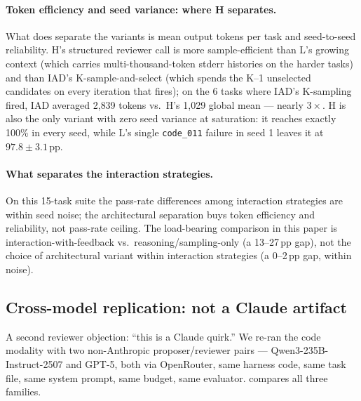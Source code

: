 \documentclass[11pt]{article}
\begin{document}
\paragraph{Token efficiency and seed variance: where H separates.} What does separate the variants is mean output tokens per task and seed-to-seed reliability. H's structured reviewer call is more sample-efficient than L's growing context (which carries multi-thousand-token stderr histories on the harder tasks) and than IAD's K-sample-and-select (which spends the K--1 unselected candidates on every iteration that fires); on the 6 tasks where IAD's K-sampling fired, IAD averaged 2{,}839 tokens vs.\ H's 1{,}029 global mean --- nearly $3\times$. H is also the only variant with zero seed variance at saturation: it reaches exactly 100\% in every seed, while L's single \texttt{code\_011} failure in seed 1 leaves it at $97.8 \pm 3.1$\,pp.

\paragraph{What separates the interaction strategies.} On this 15-task suite the pass-rate differences among interaction strategies are within seed noise; the architectural separation buys token efficiency and reliability, not pass-rate ceiling. The load-bearing comparison in this paper is interaction-with-feedback vs.\ reasoning/sampling-only (a 13--27\,pp gap), not the choice of architectural variant within interaction strategies (a 0--2\,pp gap, within noise).

\subsection{Cross-model replication: not a Claude artifact}
\label{sec:harness-crossmodel}

A second reviewer objection: ``this is a Claude quirk.'' We re-ran the code modality with two non-Anthropic proposer/reviewer pairs --- Qwen3-235B-Instruct-2507 and GPT-5, both via OpenRouter, same harness code, same task file, same system prompt, same budget, same evaluator.  compares all three families.
\end{document}
